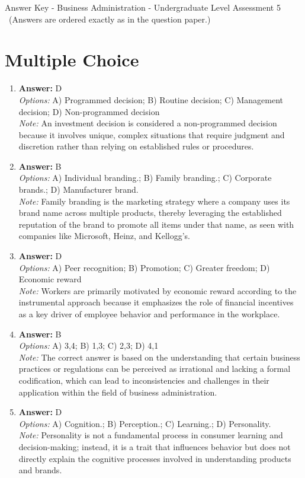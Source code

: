 \documentclass[12pt]{article}
\begin{document}
\begin{center}
Answer Key - Business Administration - Undergraduate Level Assessment 5 \
\small (Answers are ordered exactly as in the question paper.)
\end{center}

\section*{Multiple Choice}
\begin{enumerate}[label=\arabic*.]
\item \textbf{Answer:} D
\\ \textit{Options:} A) Programmed decision; B) Routine decision; C) Management decision; D) Non-programmed decision
\\ \textit{Note:} An investment decision is considered a non-programmed decision because it involves unique, complex situations that require judgment and discretion rather than relying on established rules or procedures.
\item \textbf{Answer:} B
\\ \textit{Options:} A) Individual branding.; B) Family branding.; C) Corporate brands.; D) Manufacturer brand.
\\ \textit{Note:} Family branding is the marketing strategy where a company uses its brand name across multiple products, thereby leveraging the established reputation of the brand to promote all items under that name, as seen with companies like Microsoft, Heinz, and Kellogg's.
\item \textbf{Answer:} D
\\ \textit{Options:} A) Peer recognition; B) Promotion; C) Greater freedom; D) Economic reward
\\ \textit{Note:} Workers are primarily motivated by economic reward according to the instrumental approach because it emphasizes the role of financial incentives as a key driver of employee behavior and performance in the workplace.
\item \textbf{Answer:} B
\\ \textit{Options:} A) 3,4; B) 1,3; C) 2,3; D) 4,1
\\ \textit{Note:} The correct answer is based on the understanding that certain business practices or regulations can be perceived as irrational and lacking a formal codification, which can lead to inconsistencies and challenges in their application within the field of business administration.
\item \textbf{Answer:} D
\\ \textit{Options:} A) Cognition.; B) Perception.; C) Learning.; D) Personality.
\\ \textit{Note:} Personality is not a fundamental process in consumer learning and decision-making; instead, it is a trait that influences behavior but does not directly explain the cognitive processes involved in understanding products and brands.
\end{enumerate}
\end{document}
